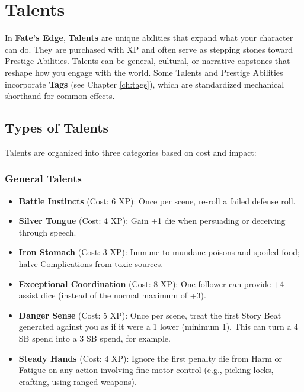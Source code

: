
\chapter{Talents}
\label{ch:talents}

In \textbf{Fate's Edge}, \textbf{Talents}  are unique abilities that expand what your character can do. They are purchased with XP and often serve as stepping stones toward Prestige Abilities. Talents can be general, cultural, or narrative capstones that reshape how you engage with the world. Some Talents and Prestige Abilities incorporate \textbf{Tags} (see Chapter \ref{ch:tags}), which are standardized mechanical shorthand for common effects.

\section{Types of Talents}

Talents are organized into three categories based on cost and impact:

\subsection*{General Talents}

\begin{itemize}
    \item \textbf{Battle Instincts} (Cost: 6 XP): Once per scene, re-roll a failed defense roll.
    \item \textbf{Silver Tongue} (Cost: 4 XP): Gain +1 die when persuading or deceiving through speech.
    \item \textbf{Iron Stomach} (Cost: 3 XP): Immune to mundane poisons and spoiled food; halve Complications from toxic sources.
    \item \textbf{Exceptional Coordination} (Cost: 8 XP): One follower can provide +4 assist dice (instead of the normal maximum of +3).
    \item \textbf{Danger Sense} (Cost: 5 XP): Once per scene, treat the first Story Beat generated against you as if it were a 1 lower (minimum 1). This can turn a 4 SB spend into a 3 SB spend, for example.
    \item \textbf{Steady Hands} (Cost: 4 XP): Ignore the first penalty die from Harm or Fatigue on any action involving fine motor control (e.g., picking locks, crafting, using ranged weapons).
\end{itemize}

